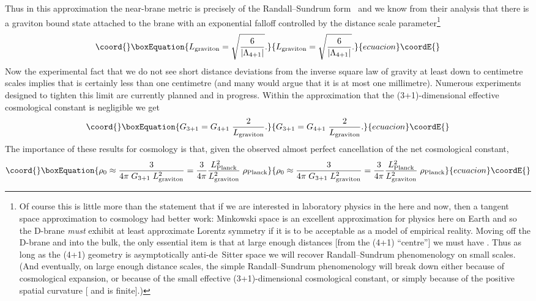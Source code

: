 \documentclass[a4paper,12pt]{article}
\begin{document}
%
Thus in this approximation the near-brane metric is precisely of the
Randall--Sundrum form~\cite{RS1,RS2} and we know from their analysis
that there is a graviton bound state attached to the brane with an
exponential falloff controlled by the distance scale
parameter\footnote{
Of course this is little more than the statement that if we are
interested in laboratory physics in the here and now, then a tangent
space approximation to cosmology had better work: Minkowski space is
an excellent approximation for physics here on Earth and so the
D-brane {\em must\/} exhibit at least approximate Lorentz symmetry if
it is to be acceptable as a model of empirical reality. Moving off the
D-brane and into the bulk, the only essential item is that at large
enough distances [from the (4+1) ``centre''] we must have \coordHE{}. Thus as long as the (4+1) geometry is asymptotically
anti-de~Sitter space we will recover Randall--Sundrum phenomenology on
small scales. (And eventually, on large enough distance scales, the
simple Randall--Sundrum phenomenology will break down either because of
cosmological expansion, or because of the small effective
(3+1)-dimensional cosmological constant, or simply because of the
positive spatial curvature [\coordHE{} and \coordHE{} is finite].)  }
%
\begin{equation}\coord{}\boxEquation{
L_\graviton = \sqrt{6\over|\Lambda_{4+1}|}.
}{
L_\graviton = \sqrt{6\over|\Lambda_{4+1}|}.
}{ecuacion}\coordE{}\end{equation}
%
Now the experimental fact that we do not see short distance deviations
from the inverse square law of gravity at least down to centimetre
scales implies that \coordHE{} is certainly less than one
centimetre (and many would argue that it is at most one
millimetre). Numerous experiments designed to tighten this limit are
currently planned and in progress. Within the approximation that the
(3+1)-dimensional effective cosmological constant is negligible we get
%
\begin{equation}\coord{}\boxEquation{
G_{3+1} = G_{4+1} \; {2\over L_\graviton}.
}{
G_{3+1} = G_{4+1} \; {2\over L_\graviton}.
}{ecuacion}\coordE{}\end{equation}
The importance of these results for cosmology is that, given the
observed almost perfect cancellation of the net cosmological constant,
%
\begin{equation}\coord{}\boxEquation{
\rho_0 \approx {3\over4\pi\;G_{3+1}\;L_\graviton^2} 
= {3\over4\pi} {L_\Planck^2\over L_\graviton^2}\; \rho_\Planck 
}{
\rho_0 \approx {3\over4\pi\;G_{3+1}\;L_\graviton^2} 
= {3\over4\pi} {L_\Planck^2\over L_\graviton^2}\; \rho_\Planck 
}{ecuacion}\coordE{}\end{equation}
\end{document}
